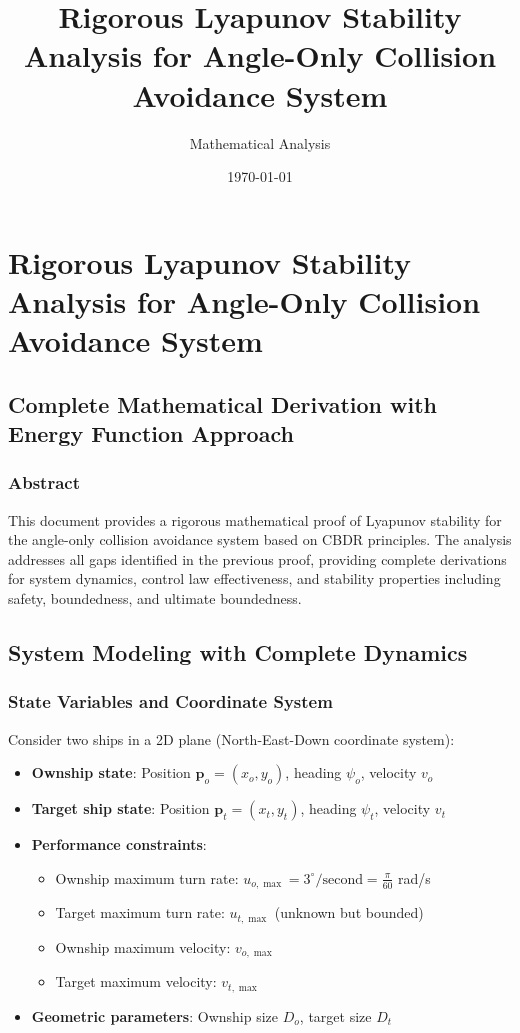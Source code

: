 \documentclass[11pt,a4paper]{article}
\title{Rigorous Lyapunov Stability Analysis for Angle-Only Collision Avoidance System}
\author{Mathematical Analysis}
\date{\today}
\numberwithin{equation}{section}
\begin{document}
\maketitle

\tableofcontents
\newpage

\section{Rigorous Lyapunov Stability Analysis for Angle-Only Collision Avoidance System}

\subsection{Complete Mathematical Derivation with Energy Function Approach}

\subsubsection{Abstract}
This document provides a rigorous mathematical proof of Lyapunov stability for the angle-only collision avoidance system based on CBDR principles. The analysis addresses all gaps identified in the previous proof, providing complete derivations for system dynamics, control law effectiveness, and stability properties including safety, boundedness, and ultimate boundedness.

\subsection{System Modeling with Complete Dynamics}

\subsubsection{State Variables and Coordinate System}

Consider two ships in a 2D plane (North-East-Down coordinate system):
\begin{itemize}
\item \textbf{Ownship state}: Position $\mathbf{p}_o = (x_o, y_o)$, heading $\psi_o$, velocity $v_o$
\item \textbf{Target ship state}: Position $\mathbf{p}_t = (x_t, y_t)$, heading $\psi_t$, velocity $v_t$
\item \textbf{Performance constraints}:
   \begin{itemize}
   \item Ownship maximum turn rate: $u_{o,\max} = 3^\circ/\mathrm{second} = \frac{\pi}{60}$ rad/s
   \item Target maximum turn rate: $u_{t,\max}$ (unknown but bounded)
   \item Ownship maximum velocity: $v_{o,\max}$
   \item Target maximum velocity: $v_{t,\max}$
   \end{itemize}
\item \textbf{Geometric parameters}: Ownship size $D_o$, target size $D_t$
\end{itemize}
\end{document}

